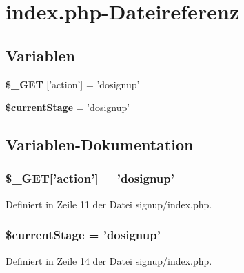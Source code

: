 \section{index.php-Dateireferenz}
\label{signup_2index_8php}
\subsection*{Variablen}
\begin{CompactItemize}
\item 
{\bf \$\_\-GET} ['action'] = 'dosignup'
\item 
{\bf \$currentStage} = 'dosignup'
\end{CompactItemize}


\subsection{Variablen-Dokumentation}
\subsubsection{\setlength{\rightskip}{0pt plus 5cm}\$\_\-GET['action'] = 'dosignup'}\label{signup_2index_8php_adfe36d0024c98a104c6592111fa6669}




Definiert in Zeile 11 der Datei signup/index.php.
\subsubsection{\setlength{\rightskip}{0pt plus 5cm}\$currentStage = 'dosignup'}\label{signup_2index_8php_9d1c6ab193850ee07d0443d7751d3adf}




Definiert in Zeile 14 der Datei signup/index.php.